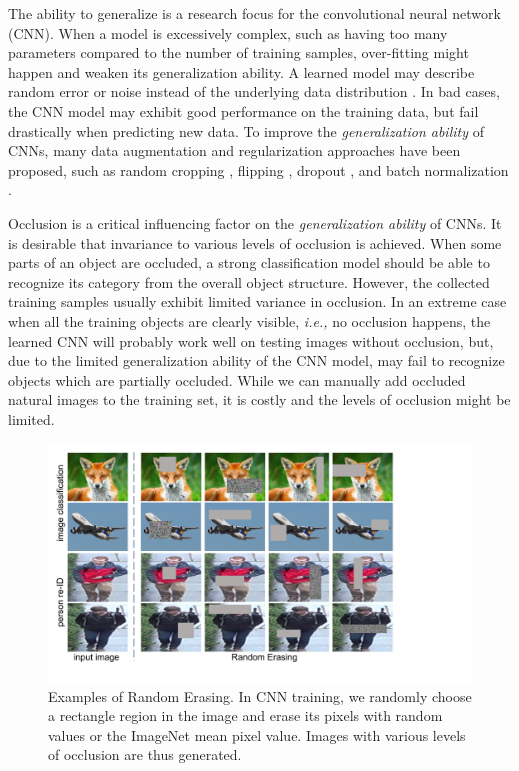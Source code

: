 \documentclass[10pt,twocolumn,letterpaper]{article}
\begin{document}


The ability to generalize is a research focus for the convolutional neural network (CNN). When a model is excessively complex, such as having too many parameters compared to the number of training samples, over-fitting might happen and weaken its generalization ability. 
A learned model may describe random error or noise instead of the underlying data distribution \cite{zhang2016understanding}. In bad cases, the CNN model may exhibit good performance on the training data, but fail drastically when predicting new data. To improve the \emph{generalization ability} of CNNs, many data augmentation and regularization approaches have been proposed, such as random cropping \cite{alexnet}, flipping \cite{vgg}, dropout \cite{srivastava2014dropout}, and batch normalization \cite{ioffe2015batch}.   

Occlusion is a critical influencing factor on the \emph{generalization ability} of CNNs. It is desirable that invariance to various levels of occlusion is achieved. When some parts of an object are occluded, a strong classification model should be able to recognize its category from the overall object structure. However, the collected training samples usually exhibit limited variance in occlusion. 
In an extreme case when all the training objects are clearly visible, \emph{i.e.,} no occlusion happens, the learned CNN will probably work well on testing images without occlusion, but, due to the limited generalization ability of the CNN model, may fail to recognize objects which are partially occluded.
    While we can manually add occluded natural images to the training set, it is costly and the levels of occlusion might be limited. 
    
\begin{figure}[t]
\centering
\includegraphics[width=0.9\linewidth]{img/example}
\caption{Examples of Random Erasing. In CNN training, we randomly choose a rectangle region in the image and erase its pixels with random values or the ImageNet mean pixel value. Images with various levels of occlusion are thus generated.}
\label{fig:example}
\end{figure}
\end{document}
